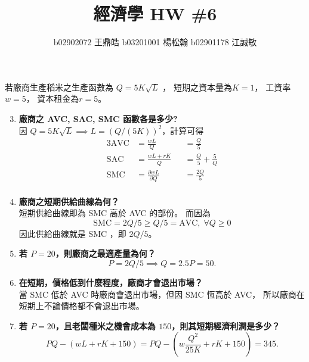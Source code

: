 \documentclass[12pt, a4paper]{article}
\title{\vspace{-1.5cm} 經濟學 HW \#6}
\author{b02902072 王鼎皓 \quad b03201001 楊松翰 \quad b02901178 江誠敏}
\newcommand{\dI}{\;\mathrm{d}}
\begin{document}
\maketitle

若廠商生產稻米之生產函數為 $Q = 5 K \sqrt{L}$ ， 短期之資本量為$K=1$，
工資率$w=5$， 資本租金為$r=5$。

\begin{enumerate}[label={\bf 6.\arabic*}]
    \setcounter{enumi}{2}
    \item {\bf 廠商之 AVC, SAC, SMC 函數各是多少?\\}
      因 $Q = 5 K \sqrt{L} \implies L = \left( Q/(5K) \right) ^2$，計算可得
      \begin{alignat*}{3}
        \text{AVC} & = \frac{w L}{Q} && = \frac{Q}{5} \\
        \text{SAC} & = \frac{w L + r K}{Q} && = \frac{Q}{5} + \frac{5}{Q} \\
        \text{SMC} & = \frac{\partial w L}{\partial Q} && = \frac{2Q}{5}\\
      \end{alignat*}
    \item {\bf 廠商之短期供給曲線為何？\\}
      短期供給曲線即為 SMC 高於 AVC 的部份。
      而因為 \[ \text{SMC} = 2Q / 5 \geq Q/5 = \text{AVC}, \; \forall Q \geq 0 \]
      因此供給曲線就是 SMC ，即 $ 2Q / 5 $。
    \item {\bf 若 $P = 20$，則廠商之最適產量為何？\\}
      \[ P = 2Q / 5 \implies Q = 2.5P = 50. \]
    \item {\bf 在短期，價格低到什麼程度，廠商才會退出市場？\\}
      當 SMC 低於 AVC 時廠商會退出市場，但因 SMC 恆高於 AVC，
      所以廠商在短期上不論價格都不會退出市場。
    \setcounter{enumi}{8}
    \item {\bf 若 $P = 20$，且老闆種米之機會成本為 $150$，則其短期經濟利潤是多少？\\}
      \[ PQ - (wL + rK + 150) = PQ - \left( w \frac{Q^2}{25K} + rK + 150 \right) = 345. \]


\end{enumerate}
\end{document}
